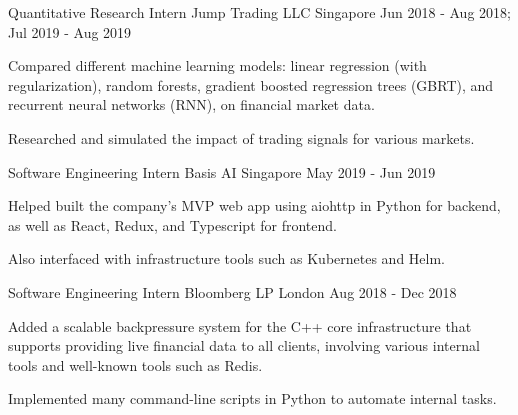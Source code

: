 

\begin{cventries}

  \cventry
  {Quantitative Research Intern} %
  {Jump Trading LLC} %
  {Singapore} %
  {Jun 2018 - Aug 2018; Jul 2019 - Aug 2019} %
  {
    \begin{cvitems} %
    \item {Compared different machine learning models: linear regression (with regularization), random forests, gradient boosted regression trees (GBRT), and recurrent neural networks (RNN), on financial market data.}
    \item {Researched and simulated the impact of trading signals for various markets.}
    \end{cvitems}
  }

  \cventry
  {Software Engineering Intern} %
  {Basis AI} %
  {Singapore} %
  {May 2019 - Jun 2019} %
  {
    \begin{cvitems} %
    \item {Helped built the company's MVP web app using aiohttp in Python for backend, as well as React, Redux, and Typescript for frontend.}
    \item {Also interfaced with infrastructure tools such as Kubernetes and Helm.}
    \end{cvitems}
  }

  \cventry
  {Software Engineering Intern} %
  {Bloomberg LP} %
  {London} %
  {Aug 2018 - Dec 2018} %
  {
    \begin{cvitems} %
    \item {Added a scalable backpressure system for the C++ core infrastructure that supports providing live financial data to all clients, involving various internal tools and well-known tools such as Redis.}
    \item {Implemented many command-line scripts in Python to automate internal tasks.}
    \end{cvitems}
  }


\end{cventries}

